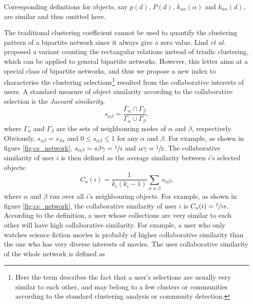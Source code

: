       Corresponding definitions for objects, say $p(d)$, $P(d)$, $k_{nn}(\alpha)$ and $k_{nn}(d)$, are similar and thus omitted here.
      
      The traditional clustering coefficient\cite{WattsStrogatz1998} cannot be used to quantify the clustering pattern of a bipartite network since it always give a zero value. Lind \textit{et al.}\cite{LindGonzalezHerrmann2005} proposed a variant counting the rectangular relations instead of triadic clustering, which can be applied to general bipartite networks. However, this letter aims at a special class of bipartite networks, and thus we propose a new index to characterise the clustering selections\footnote{Here the term  describes the fact that a user's selections are usually very similar to each other, and may belong to a few clusters or communities according to the standard clustering analysis or community detection.} resulted from the collaborative interests of users. A standard measure of object similarity according to the collaborative selection is the \emph{Jaccard similarity}\cite{Jaccard1901}.
      \begin{equation}
        s_{\alpha\beta} = \frac{\Gamma_\alpha \cap \Gamma_\beta}{\Gamma_\alpha \cup \Gamma_\beta}\mbox{,}
      \end{equation}
      where $\Gamma_\alpha$ and $\Gamma_\beta$ are the sets of neighbouring nodes of $\alpha$ and $\beta$, respectively. Obviously, $s_{\alpha\beta} = s_{\beta\alpha}$ and $0 \leq s_{\alpha\beta} \leq 1$ for any $\alpha$ and $\beta$. For example, as shown in figure \ref{fig:cs_network}, $s_{\alpha\beta} = s{\beta\gamma} = \sfrac{1}{3}$ and ${\alpha\gamma} = \sfrac{1}{2}$. The collaborative similarity of user $i$ is then defined as the average similarity between $i$'s selected objects:
      \begin{equation}
        C_u(i) = \frac{1}{k_i(k_i-1)} \sum_{\alpha\neq\beta} s_{\alpha\beta}\mbox{,}
      \end{equation}
      where $\alpha$ and $\beta$ run over all $i$'s neighbouring objects. For example, as shown in figure \ref{fig:cs_network}, the collaborative similarity of user $i$ is $C_u(i) = \sfrac{7}{18}$. According to the definition, a user whose collections are very similar to each other will have high collaborative similarity. For example, a user who only watches science fiction movies is probably of higher collaborative similarity than the one who has very diverse interests of movies. The user collaborative similarity of the whole network is defined as
